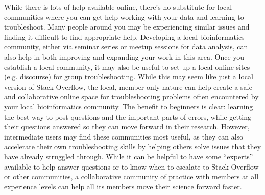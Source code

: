 \documentclass[10pt,letterpaper]{article}
\begin{document}
While there is lots of help available online, there’s no substitute for local communities where you can get help working with your data and learning to troubleshoot. 
Many people around you may be experiencing similar issues and finding it difficult to find appropriate help. 
Developing a local bioinformatics community, either via seminar series or meetup sessions for data analysis, can also help in both improving and expanding your work in this area. 
Once you establish a local community, it may also be useful to set up a local online sites (e.g. discourse) for group troubleshooting. 
While this may seem like just a local version of Stack Overflow, the local, member-only nature can help create a safe and collaborative online space for troubleshooting problems often encountered by your local bioinformatics community. 
The benefit to beginners is clear: learning the best way to post questions and the important parts of errors, while getting their questions answered so they can move forward in their research. 
However, intermediate users may find these communities most useful, as they can also accelerate their own troubleshooting skills by helping others solve issues that they have already struggled through. 
While it can be helpful to have some “experts” available to help answer questions or to know when to escalate to Stack Overflow or other communities, a collaborative community of practice with members at all experience levels can help all its members move their science forward faster.




\end{document}

